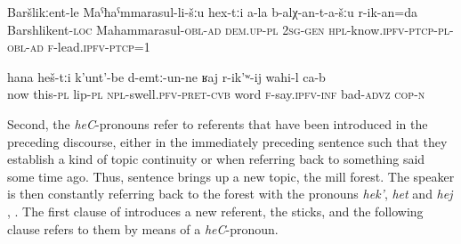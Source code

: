 \begin{exe}
	\ex	\label{To Bashlikent, to MR, to the ones that you know we will bring you}
	\gll 	Baršlikːent-le	Maˁħaˁmmarasul-li-šːu	hex-tːi	a-la	b-alχ-an-t-a-šːu	r-ik-an=da \\
		Barshlikent-\textsc{loc}	Mahammarasul-\textsc{obl-ad}	\textsc{dem.up-pl}	\textsc{2sg-gen}	\textsc{hpl}-know.\textsc{ipfv}-\textsc{ptcp}-\textsc{pl}-\textsc{obl-ad} \textsc{f}-lead.\textsc{ipfv}-\textsc{ptcp}=1\\
	\glt	{}

	\ex	\label{Now the (i.e. my) lips are swollen, it is difficult to talk}
	\gll	hana	heš-tːi	k'unt'-be	d-emtː-un-ne		ʁaj	r-ik'ʷ-ij	wahi-l	ca-b \\
now	this-\textsc{pl}	lip-\textsc{pl}	\textsc{npl}-swell.\textsc{pfv}-\textsc{pret}-\textsc{cvb}	word	\textsc{f}-say.\textsc{ipfv}-\textsc{inf}	bad-\textsc{advz}	\textsc{cop-n}\\
	\glt	{}
\end{exe}

Second, the \textit{heC}-pronouns refer to referents that have been introduced in the preceding discourse, either in the immediately preceding sentence such that they establish a kind of topic continuity or when referring back to something said some time ago. Thus, sentence  brings up a new topic, the mill forest. The speaker is then constantly referring back to the forest with the pronouns \textit{hek'}, \textit{het} and \textit{hej} , . The first clause of  introduces a new referent, the sticks, and the following clause refers to them by means of a \textit{heC}-pronoun.

